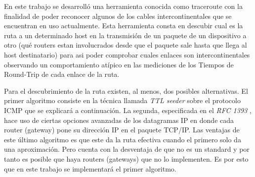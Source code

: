 En este trabajo se desarrolló una herramienta conocida como traceroute con
la finalidad de poder reconocer algunos de los cables intercontinentales
que se encuentran en uso actualmente. Esta herramienta
consta en descubir cual es la ruta a un determinado host en la transmisión 
de un paquete de un dispositivo a otro (qué routers estan
involucrados desde que el paquete sale hasta que llega al host destinatario)
para asi poder comprobar cuales enlaces son intercontinentales 
observando un comportamiento atípico en las mediciones de los
Tiempos de Round-Trip de cada enlace de la ruta.

Para el descubrimiento de la ruta existen, al menos, dos posibles alternativas. El primer
algoritmo consiste en la técnica llamada \emph{TTL seeder} sobre el protocolo
ICMP que se explicará a continuación. La segunda, especificada en el \emph{RFC
1393} \cite{rfc1393}, hace uso de ciertas opciones avanzadas de los datagramas IP en donde
cada router (gateway) pone su dirección IP en el paquete TCP/IP. Las ventajas
de este último algoritmo es que este da la ruta efectiva
cuando el primero solo da una aproximación. Pero cuenta con la desventaja de que no es un standard
y por tanto es posible que haya routers (gateways) que no lo
implementen. Es por esto que en este trabajo se implementará el primer
algoritmo.
